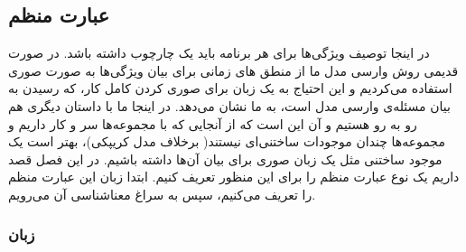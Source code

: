 \subsection{عبارت منظم}
در اینجا توصیف ویژگی‌ها برای هر برنامه باید یک چارچوب داشته باشد. در صورت قدیمی روش وارسی مدل ما از منطق های زمانی برای بیان ویژگی‌ها به صورت صوری استفاده می‌کردیم و این احتیاج به یک زبان برای صوری کردن کامل کار، که رسیدن به بیان مسئله‌ی وارسی مدل است، به ما نشان می‌دهد. در اینجا ما با داستان دیگری هم رو به رو هستیم و آن این است که از آنجایی که با مجموعه‌ها سر و کار داریم و مجموعه‌ها چندان موجودات ساختنی‌ای نیستند( برخلاف مدل کریپکی)، بهتر است یک موجود ساختنی مثل یک زبان صوری برای بیان آن‌ها داشته باشیم. در این فصل قصد داریم یک نوع عبارت منظم را برای این منظور تعریف کنیم. ابتدا زبان این عبارت منظم را تعریف می‌کنیم، سپس به سراغ معناشناسی آن می‌رویم. 
\subsubsection{زبان}



